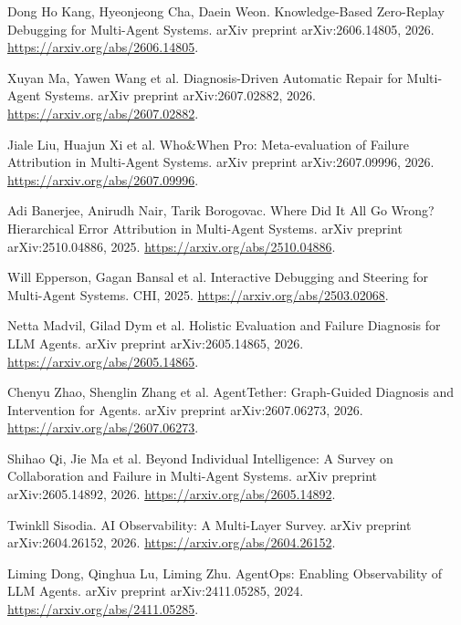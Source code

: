 
 Dong Ho Kang, Hyeonjeong Cha, Daein Weon. Knowledge-Based Zero-Replay Debugging for Multi-Agent Systems. arXiv preprint arXiv:2606.14805, 2026. \url{https://arxiv.org/abs/2606.14805}.

 Xuyan Ma, Yawen Wang et al. Diagnosis-Driven Automatic Repair for Multi-Agent Systems. arXiv preprint arXiv:2607.02882, 2026. \url{https://arxiv.org/abs/2607.02882}.

 Jiale Liu, Huajun Xi et al. {Who\&When Pro}: Meta-evaluation of Failure Attribution in Multi-Agent Systems. arXiv preprint arXiv:2607.09996, 2026. \url{https://arxiv.org/abs/2607.09996}.

 Adi Banerjee, Anirudh Nair, Tarik Borogovac. Where Did It All Go Wrong? Hierarchical Error Attribution in Multi-Agent Systems. arXiv preprint arXiv:2510.04886, 2025. \url{https://arxiv.org/abs/2510.04886}.

 Will Epperson, Gagan Bansal et al. Interactive Debugging and Steering for Multi-Agent Systems. CHI, 2025. \url{https://arxiv.org/abs/2503.02068}.

 Netta Madvil, Gilad Dym et al. Holistic Evaluation and Failure Diagnosis for {LLM} Agents. arXiv preprint arXiv:2605.14865, 2026. \url{https://arxiv.org/abs/2605.14865}.

 Chenyu Zhao, Shenglin Zhang et al. {AgentTether}: Graph-Guided Diagnosis and Intervention for Agents. arXiv preprint arXiv:2607.06273, 2026. \url{https://arxiv.org/abs/2607.06273}.

 Shihao Qi, Jie Ma et al. Beyond Individual Intelligence: A Survey on Collaboration and Failure in Multi-Agent Systems. arXiv preprint arXiv:2605.14892, 2026. \url{https://arxiv.org/abs/2605.14892}.

 Twinkll Sisodia. {AI} Observability: A Multi-Layer Survey. arXiv preprint arXiv:2604.26152, 2026. \url{https://arxiv.org/abs/2604.26152}.

 Liming Dong, Qinghua Lu, Liming Zhu. {AgentOps}: Enabling Observability of {LLM} Agents. arXiv preprint arXiv:2411.05285, 2024. \url{https://arxiv.org/abs/2411.05285}.

